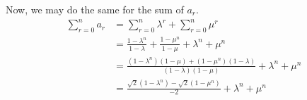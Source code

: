 \documentclass[12pt]{article}
\begin{document}
Now, we may do the same for the sum of $a_r$.
\begin{align*}
    \sum_{r=0}^{n} a_r & = \sum_{r=0}^{n} \lambda^r + \sum_{r=0}^{n} \mu^r                                            \\
                       & = \frac{1-\lambda^n}{1-\lambda} + \frac{1-\mu^n}{1-\mu} + \lambda^n + \mu^n                  \\
                       & = \frac{(1-\lambda^n)(1-\mu) + (1-\mu^n)(1-\lambda)}{(1-\lambda)(1-\mu)} + \lambda^n + \mu^n \\
                       & = \frac{\sqrt{2}(1-\lambda^n) - \sqrt{2}(1-\mu^n)}{-2} + \lambda^n + \mu^n                   \\
\end{align*}
\end{document}

